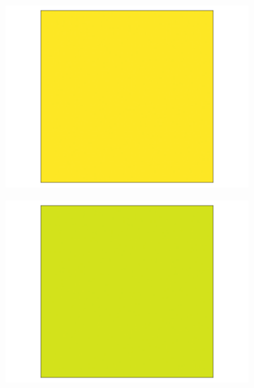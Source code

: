 \documentclass[../main.tex]{subfiles}
\begin{document}
\begin{figure}[H]
    \begin{subfigure}[b]{0.11\textwidth}
        \centering 
        \includegraphics[keepaspectratio, width = \linewidth]{../figures/fig3.9.2.1.png}
    \end{subfigure}
    \hfill
    \begin{subfigure}[b]{0.11\textwidth}
        \centering 
        \includegraphics[keepaspectratio, width = \linewidth]{../figures/fig3.9.2.2.png}
    \end{subfigure}
    \hfill
    \begin{subfigure}[b]{0.11\textwidth}
        \centering 

\end{subfigure}
\end{figure}
\end{document}
